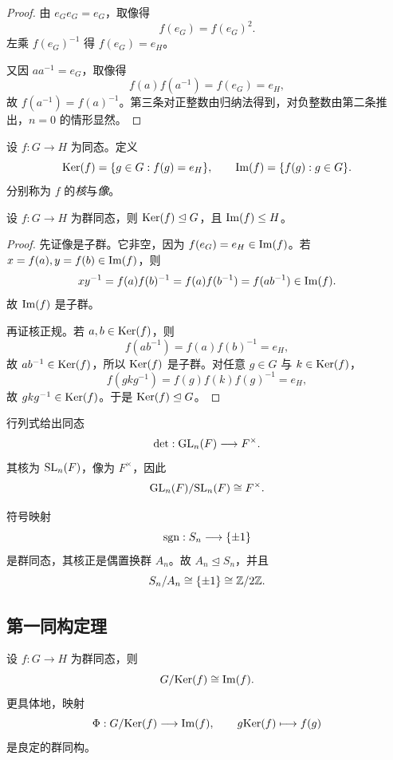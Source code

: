 \begin{proof}
由 $e_Ge_G=e_G$，取像得
\[
 f(e_G)=f(e_G)^2.
\]
左乘 $f(e_G)^{-1}$ 得 $f(e_G)=e_H$。

又因 $aa^{-1}=e_G$，取像得
\[
 f(a)f(a^{-1})=f(e_G)=e_H,
\]
故 $f(a^{-1})=f(a)^{-1}$。第三条对正整数由归纳法得到，对负整数由第二条推出，$n=0$ 的情形显然。
\end{proof}

\begin{definition}
设 $f:G\to H$ 为同态。定义
\[
\mathrm{Ker}(f)=\{g\in G:f(g)=e_H\}, \qquad \mathrm{Im}(f)=\{f(g):g\in G\}.
\]
分别称为 $f$ 的\emph{核}与\emph{像}。
\end{definition}

\begin{proposition}
设 $f:G\to H$ 为群同态，则 $\mathrm{Ker}(f)\trianglelefteq G$，且 $\mathrm{Im}(f)\le H$。
\end{proposition}

\begin{proof}
先证像是子群。它非空，因为 $f(e_G)=e_H\in \mathrm{Im}(f)$。若 $x=f(a),y=f(b)\in \mathrm{Im}(f)$，则
\[
 xy^{-1}=f(a)f(b)^{-1}=f(a)f(b^{-1})=f(ab^{-1}) \in \mathrm{Im}(f).
\]
故 $\mathrm{Im}(f)$ 是子群。

再证核正规。若 $a,b\in \mathrm{Ker}(f)$，则
\[
 f(ab^{-1})=f(a)f(b)^{-1}=e_H,
\]
故 $ab^{-1}\in \mathrm{Ker}(f)$，所以 $\mathrm{Ker}(f)$ 是子群。对任意 $g\in G$ 与 $k\in \mathrm{Ker}(f)$，
\[
 f(gkg^{-1})=f(g)f(k)f(g)^{-1}=e_H,
\]
故 $gkg^{-1}\in \mathrm{Ker}(f)$。于是 $\mathrm{Ker}(f)\trianglelefteq G$。
\end{proof}

\begin{example}[行列式同态]
行列式给出同态
\[
 \det:\mathrm{GL}_n(F) \longrightarrow F^\times.
\]
其核为 $\mathrm{SL}_n(F)$，像为 $F^\times$，因此
\[
 \mathrm{GL}_n(F)/\mathrm{SL}_n(F) \cong F^\times.
\]
\end{example}

\begin{example}[符号同态]
符号映射
\[
 \operatorname{sgn}:S_n \longrightarrow \{\pm 1\}
\]
是群同态，其核正是偶置换群 $A_n$。故 $A_n\trianglelefteq S_n$，并且
\[
 S_n/A_n \cong \{\pm1\} \cong \mathbb{Z}/2\mathbb{Z}.
\]
\end{example}

\subsection*{第一同构定理}

\begin{theorem}[第一同构定理]
设 $f:G\to H$ 为群同态，则
\[
 G/\mathrm{Ker}(f) \cong \mathrm{Im}(f).
\]
更具体地，映射
\[
 \Phi:G/\mathrm{Ker}(f) \longrightarrow \mathrm{Im}(f), \qquad g\mathrm{Ker}(f) \longmapsto f(g)
\]
是良定的群同构。
\end{theorem}

